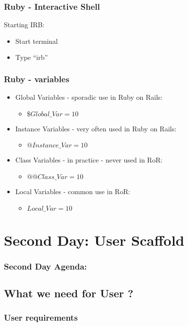 \documentclass{beamer}
\begin{document}
\begin{frame}
  \frametitle{Ruby - Interactive Shell }
  Starting IRB:
  \begin{itemize}
    \item Start terminal
    \item Type ``irb''
  \end{itemize}
\end{frame}


\begin{frame}
  \frametitle{Ruby - variables}
  \begin{itemize}
    \item Global Variables - sporadic use in Ruby on Rails:
      \begin{itemize}
        \item $ \$Global\_Var=10$
      \end{itemize}
    \item Instance Variables - very often used in Ruby on Rails:
      \begin{itemize}
        \item $ @Instance\_Var=10$
      \end{itemize}
    \item Class Variables - in practice - never used in RoR:
      \begin{itemize}
        \item $ @@Class\_Var=10$
      \end{itemize}
    \item Local Variables - common use in RoR:
      \begin{itemize}
        \item $ Local\_Var=10$
      \end{itemize}
    \end{itemize}
  
\end{frame}

\section{Second Day: User Scaffold}
    \begin{frame}
      \frametitle{Second Day Agenda:}
      \tableofcontents
      [
      currentsection,
      sectionstyle=hide/hide,
      subsectionstyle=show/show/hide
      ]
    \end{frame}

  \subsection{What we need for User ?}
    \begin{frame}
      \frametitle{User requirements}
    \end{frame}
\end{document}
